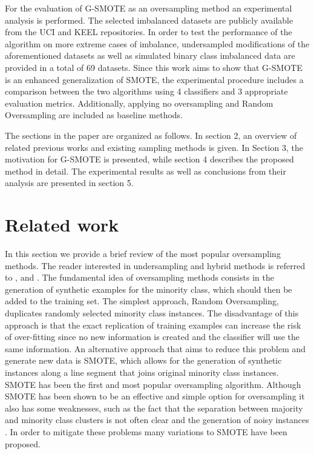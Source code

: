 \documentclass[parskip=full]{scrartcl}
\begin{document}
For the evaluation of G-SMOTE as an oversampling method an experimental analysis is performed. The selected imbalanced datasets are publicly available from the UCI \cite{Lichman2013} and KEEL \cite{Alcala-Fdez2011} repositories. In order to test the performance of the algorithm on more extreme cases of imbalance, undersampled modifications of the aforementioned datasets as well as simulated binary class imbalanced data are provided in a total of 69 datasets. Since this work aims to show that G-SMOTE is an enhanced generalization of SMOTE, the experimental procedure includes a comparison between the two algorithms using 4 classifiers and 3 appropriate evaluation metrics. Additionally, applying no oversampling and Random Oversampling are included as baseline methods.

The sections in the paper are organized as follows. In section 2, an overview of related previous works and existing sampling methods is given. In Section 3, the motivation for G-SMOTE is presented, while section 4 describes the proposed method in detail. The experimental results as well as conclusions from their analysis are presented in section 5.

\section{Related work}

In this section we provide a brief review of the most popular oversampling methods. The reader interested in undersampling and hybrid methods is referred to  \cite{Galar2012}, \cite{Chawla2005} and \cite{Fernandez2018}. The fundamental idea of oversampling methods consists in the generation of synthetic examples for the minority class, which should then be added to the training set. The simplest approach, Random Oversampling, duplicates randomly selected minority class instances. The disadvantage of this approach is that the exact replication of training examples can increase the risk of over-fitting since no new information is created and the classifier will use the same information. An alternative approach that aims to reduce this problem and generate new data is SMOTE, which allows for the generation of synthetic instances along a line segment that joins original minority class instances. SMOTE has been the first and most popular oversampling algorithm. Although SMOTE has been shown to be an effective and simple option for oversampling it also has some weaknesses, such as the fact that the separation between majority and minority class clusters is not often clear and the generation of noisy instances \cite{He2009}. In order to mitigate these problems many variations to SMOTE have been proposed.
\end{document}
